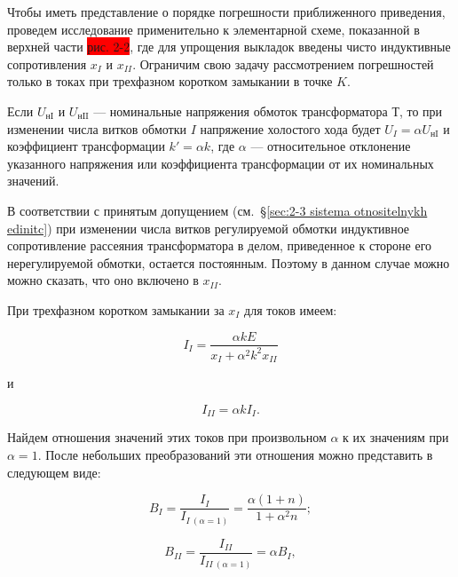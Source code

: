 \begin{small}
	\vspace{1pc}
	Чтобы иметь представление о порядке погрешности приближенного приведения, проведем исследование применительно к элементарной схеме, показанной в верхней части \colorbox{red}{рис. 2-2}, где для упрощения выкладок введены чисто индуктивные сопротивления $ x_I $ и $ x_{II} $. Ограничим свою задачу рассмотрением погрешностей только в токах при трехфазном коротком замыкании в точке $ K $.
	
	Если $ U_{\text{нI}} $ и $ U_{\text{нII}} $ --- номинальные напряжения обмоток трансформатора $ Т $, то при изменении числа витков обмотки $ I $ напряжение холостого хода будет $ U_I = \alpha U_{\text{нI}} $ и коэффициент трансформации $ k'=\alpha k $, где $ \alpha $ --- относительное отклонение указанного напряжения или коэффициента трансформации от их номинальных значений.
	
	В соответствии с принятым допущением (см.~§\ref{sec:2-3 sistema otnositelnykh edinitc}) при изменении числа витков регулируемой обмотки индуктивное сопротивление рассеяния трансформатора в делом, приведенное к стороне его нерегулируемой обмотки, остается постоянным. Поэтому в данном случае можно можно сказать, что оно включено в $ x_{II} $.
	
	При трехфазном коротком замыкании за $ x_I $ для токов имеем:
	
	\begin{equation} %
		\label{eq:2-27 I_I_tok_pri_kz_za_xI}
		I_I = \frac{\alpha k E}{x_I + \alpha^2 k^2 x_{II}}
	\end{equation}
	
	и
	
	\begin{equation} %
		\label{eq:2-28 I_II_tok_pri_kz_za_xI}
		I_{II} = \alpha k I_I.
	\end{equation}
	
	Найдем отношения значений этих токов при произвольном $ \alpha $ к их значениям при $ \alpha = 1 $. После небольших преобразований эти отношения можно представить в следующем виде:
	
	\begin{equation} %
		\label{eq:2-29 B_I_otnoshenie_tokov}
		B_I = \frac{I_I}{I_{I~(\alpha=1)}} = \frac{\alpha(1+n)}{1+\alpha^2 n};
	\end{equation}
	
	\begin{equation} %
		\label{eq:2-30 B_II_otnoshenie_tokov}
		B_{II} = \frac{I_{II}}{I_{II~(\alpha=1)}} = \alpha B_I,
	\end{equation}


\end{small}
